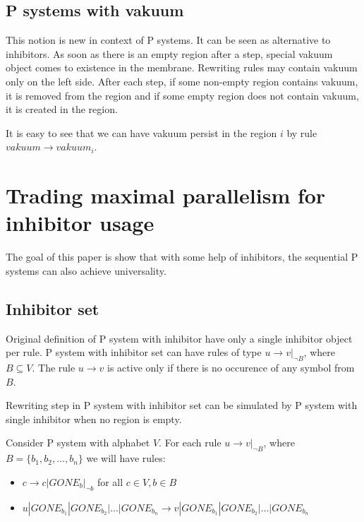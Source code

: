 \documentclass[a4paper,10pt]{article}
\begin{document}
\subsection{P systems with vakuum}
This notion is new in context of P systems. It can be seen as alternative to inhibitors. As soon as there is an empty region after a step, special vakuum object comes to existence in the membrane. Rewriting rules may contain vakuum only on the left side. After each step, if some non-empty region contains vakuum, it is removed from the region and if some empty region does not contain vakuum, it is created in the region.

It is easy to see that we can have vakuum persist in the region $i$ by rule $vakuum\rightarrow vakuum_i$.

\section{Trading maximal parallelism for inhibitor usage}
The goal of this paper is show that with some help of inhibitors, the sequential P systems can also achieve universality.

\subsection{Inhibitor set}
Original definition of P system with inhibitor have only a single inhibitor object per rule. P system with inhibitor set can have rules of type $u\rightarrow v|_{\neg B}$, where $B\subseteq V$. The rule $u\rightarrow v$ is active only if there is no occurence of any symbol from $B$.

\begin{lemma}
\label{lemma:inhibitor_step}
  Rewriting step in P system with inhibitor set can be simulated by P system with single inhibitor when no region is empty.
\end{lemma}

\begin{dokaz}
  Consider P system with alphabet $V$.
  For each rule $u\rightarrow v|_{\neg B}$, where $B=\{b_1, b_2, \dots ,b_n\}$ we will have rules:
  \begin{itemize}
    \item $c \rightarrow c|GONE_{b}|_{\neg b}$ for all $ c\in V, b\in B$
    \item $u|GONE_{b_1}|GONE_{b_2}|\dots|GONE_{b_n} \rightarrow v|GONE_{b_1}|GONE_{b_2}|\dots|GONE_{b_n}$
  \end{itemize}
\end{dokaz}
\end{document}

